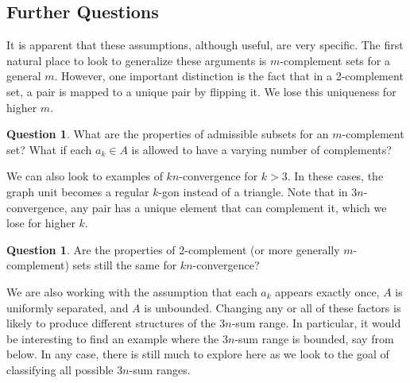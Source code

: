 \documentclass{article}
\theoremstyle{definition}
\newtheorem{question}[theorem]{Question}
\begin{document}
\subsection{Further Questions}
It is apparent that these assumptions, although useful, are very specific. The first natural place to look to generalize these arguments is $m$-complement sets for a general $m$. However, one important distinction is the fact that in a 2-complement set, a pair is mapped to a unique pair by flipping it. We lose this uniqueness for higher $m$.
\begin{question}
    What are the properties of admissible subsets for an $m$-complement set? What if each $a_k \in A$ is allowed to have a varying number of complements?
\end{question}
We can also look to examples of $kn$-convergence for $k > 3$. In these cases, the graph unit becomes a regular $k$-gon instead of a triangle. Note that in $3n$-convergence, any pair has a unique element that can complement it, which we lose for higher $k$.
\begin{question}
    Are the properties of 2-complement (or more generally $m$-complement) sets still the same for $kn$-convergence?
\end{question}
We are also working with the assumption that each $a_k$ appears exactly once, $A$ is uniformly separated, and $A$ is unbounded. Changing any or all of these factors is likely to produce different structures of the $3n$-sum range. In particular, it would be interesting to find an example where the $3n$-sum range is bounded, say from below. In any case, there is still much to explore here as we look to the goal of classifying all possible $3n$-sum ranges.




\end{document}

